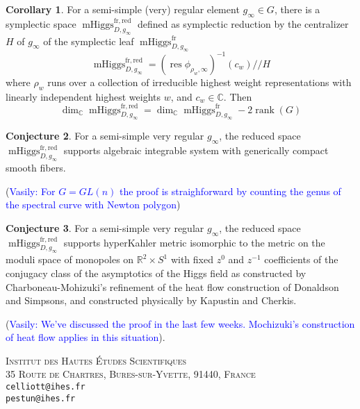 \documentclass[11pt, oneside, reqno]{amsart}
\theoremstyle{definition} \newtheorem{definition}{Definition}[section]
\newtheorem{conjecture}[definition]{Conjecture}
\newtheorem{corollary}[definition]{Corollary}
\theoremstyle{definition} \newtheorem{remark}[definition]{Remark}
\theoremstyle{definition} \newtheorem{remarks}[definition]{Remarks}
\theoremstyle{definition} \newtheorem{question}[definition]{Question}
\theoremstyle{definition} \newtheorem*{note}{Note}
\theoremstyle{definition} \newtheorem{example}[definition]{Example}
\theoremstyle{definition} \newtheorem{examples}[definition]{Examples}
\DeclareMathOperator{\rank}{rank}
\DeclareMathOperator{\res}{res}
\DeclareMathOperator{\mhiggs}{mHiggs}
\newcommand{\fr}{\mathrm{fr}}
\newcommand{\vasily}[1]{(\textcolor{blue}{Vasily: #1})}
\begin{document}
\newcommand{\red}{\mathrm{red}}
\begin{corollary}
  For a semi-simple (very) regular element $g_\infty \in G$,
  there is a symplectic space $\mhiggs^{\fr, \red}_{D, g_\infty}$ defined as symplectic reduction
  by the centralizer $H$ of $g_\infty$ of the symplectic leaf $\mhiggs^{\fr}_{D, g_\infty}$
  \begin{equation}
 \mhiggs^{\fr, \red}_{D, g_\infty} = (\res \phi_{\rho_{w}, \infty} )^{-1} (c_{w}) // H
  \end{equation}
  where $\rho_{w}$ runs over a collection of irreducible
  highest weight representations with linearly independent highest weights $w$,
  and $c_{w} \in \mathbb{C}$. Then
  \begin{equation}
   \dim_{\mathbb{C}}  \mhiggs^{\fr, \red}_{D, g_\infty}  =    \dim_{\mathbb{C}}  \mhiggs^{\fr}_{D, g_\infty} - 2 \rank(G)
  \end{equation}
\end{corollary}
  
\begin{conjecture}
  For a semi-simple very regular $g_\infty$, the reduced space  $\mhiggs^{\fr, \red}_{D, g_\infty}$  supports  algebraic integrable system with generically compact smooth fibers.
\end{conjecture}
\vasily{For $G =GL(n)$ the proof is straighforward by counting the genus of the spectral curve
with Newton polygon}

\begin{conjecture}
  For a semi-simple very regular $g_\infty$, the reduced space  $\mhiggs^{\fr, \red}_{D, g_\infty}$
  supports hyperKahler metric isomorphic
  to the metric on the moduli space of monopoles on $\mathbb{R}^2 \times S^1$
  with fixed $z^{0}$ and $z^{-1}$ coefficients of the conjugacy class of the asymptotics
  of the Higgs field as constructed by Charboneau-Mohizuki's refinement of the heat flow
  construction of Donaldson and Simpsons, and constructed physically by Kapustin and Cherkis.
\end{conjecture}
\vasily{We've discussed the proof in the last few weeks. Mochizuki's construction of heat
  flow applies in this situation}. 


 








\textsc{Institut des Hautes \'Etudes Scientifiques}\\
\textsc{35 Route de Chartres, Bures-sur-Yvette, 91440, France}\\
\texttt{celliott@ihes.fr}\\ 
\texttt{pestun@ihes.fr}
 
\end{document}
